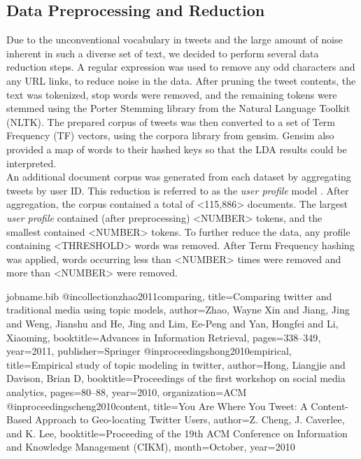 \documentclass{acm_proc_article-sp}
\begin{document}
\subsection{Data Preprocessing and Reduction}
\hspace*{5mm}Due to the unconventional vocabulary in tweets and the large amount of noise inherent in such a diverse set of text, we decided to perform several data reduction steps. A regular expression was used to remove any odd characters and any URL links, to reduce noise in the data. After pruning the tweet contents, the text was tokenized, stop words were removed, and the remaining tokens were stemmed using the Porter Stemming library from the Natural Language Toolkit (NLTK). The prepared corpus of tweets was then converted to a set of Term Frequency (TF) vectors, using the corpora library from gensim. Gensim also provided a map of words to their hashed keys so that the LDA results could be interpreted.\\
\hspace*{5mm}An additional document corpus was generated from each dataset by aggregating tweets by user ID. This reduction is referred to as the \textit{user profile} model \cite{hong2010empirical}. After aggregation, the corpus contained a total of <115,886> documents. The largest \textit{user profile} contained (after preprocessing) <NUMBER> tokens, and the smallest contained <NUMBER> tokens. To further reduce the data, any profile containing <THRESHOLD> words was removed. After Term Frequency hashing was applied, words occurring less than <NUMBER> times were removed and more than <NUMBER> were removed\cite{cheng2010content}. 


\begin{filecontents}{jobname.bib}
@incollection{zhao2011comparing,
	title={Comparing twitter and traditional media using topic models},
	author={Zhao, Wayne Xin and Jiang, Jing and Weng, Jianshu and He, Jing and Lim, Ee-Peng and Yan, Hongfei and Li, Xiaoming},
	booktitle={Advances in Information Retrieval},
	pages={338--349},
	year={2011},
	publisher={Springer}
}
@inproceedings{hong2010empirical,
	title={Empirical study of topic modeling in twitter},
	author={Hong, Liangjie and Davison, Brian D},
	booktitle={Proceedings of the first workshop on social media analytics},
	pages={80--88},
	year={2010},
	organization={ACM}
}
@inproceedings{cheng2010content,
	title={You Are Where You Tweet: A Content-Based Approach to Geo-locating Twitter Users},
	author={Z. Cheng, J. Caverlee, and K. Lee},
	booktitle={Proceeding of the 19th ACM Conference on Information and Knowledge Management (CIKM)},
	month={October},
	year={2010}
}
\end{filecontents}

\nocite{*}




\end{document}
